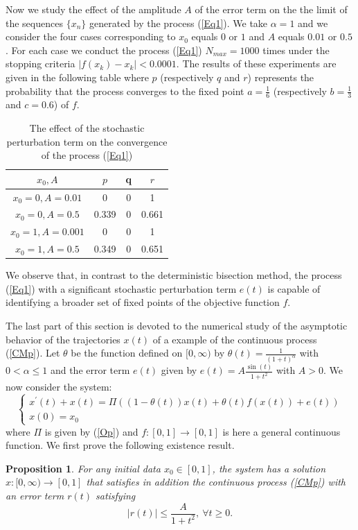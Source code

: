 \documentclass[11pt]{amsart}%
\theoremstyle{plain}
\numberwithin{equation}{section}
\newtheorem{proposition}{Proposition}[section]
\begin{document}
Now we study the effect of the amplitude $A$ of the error term  on the the limit of the sequences $\{x_n\}$ generated by the process (\ref{Eq1}). We take $\alpha=1$ and we consider the four cases corresponding to $x_0$ equals  $0$ or $1$ and $A$ equals $0.01$ or $0.5$. For each case we conduct the process (\ref{Eq1}) $N_{max}=1000$ times under the stopping criteria $\vert f(x_k)-x_k\vert<0.0001$. The results of these experiments are given in the following table where $p$ (respectively $q$ and $r$) represents the probability that the process converges to the fixed point $a=\frac{1}{6}$ (respectively $b=\frac{1}{3}$ and $c=0.6$) of $f$.
\begin{table}[h]
\centering
\begin{tabular}{cccc}
\hline\hline
$x_0, A$ & $p $ & q& $r $\\ [0.5ex]
\hline
$x_0=0, A=0.01$ & 0&0&1 \\
$x_0=0, A=0.5$ & 0.339&0&0.661 \\
$x_0=1, A=0.001$ & 0&0&1 \\
$x_0=1, A=0.5$ & 0.349&0&0.651\\ [1ex]
\end{tabular}
\caption{The effect of the stochastic perturbation term on the convergence of the process (\ref{Eq1})}
\end{table}
We observe that, in contrast to the deterministic bisection method, the process (\ref{Eq1}) with a significant stochastic perturbation term
$ e(t) $ is capable of identifying a broader set of fixed points of the objective function $f$.
\par The last part of this section is devoted to the numerical study of the asymptotic behavior of the trajectories $x(t)$ of a example of the continuous process (\ref{CMp}). Let $\theta$ be the function defined on $[0,\infty)$ by $\theta(t)=\frac{1}{(1+t)^\alpha}$ with $0<\alpha\leq1$ and the error term $e(t)$ given by $e(t)=A\frac{\sin(t)}{1+t^2}$ with $A>0$. We now consider the system:
\begin{equation}
\left\{
\begin{array}{l}
x^{\prime }(t)+x(t)=\Pi ((1-\theta (t))x(t)+\theta (t)f(x(t))+e(t)) \\
x(0)=x_{0}%
\end{array}%
\right.   \label{N1}
\end{equation}%
where $\Pi $ is given by (\ref{Op}) and  $f:[0,1]\to [0,1]$ is here a general
continuous function. We first prove the following existence result.
\begin{proposition}
For any initial data $x_{0}\in [0,1]$, the system has a solution $%
x:[0,\infty )\to [0,1]$ that satisfies in addition the
continuous process (\ref{CMp}) with an error term $r(t)$ satisfying
\[
\left\vert r(t)\right\vert \leq \frac{A}{1+t^{2}},~\forall t\geq 0.
\]
\end{proposition}
\end{document}
